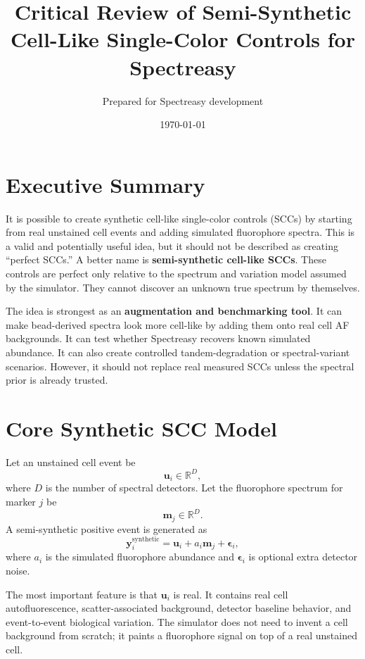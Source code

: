 \documentclass[11pt]{article}
\title{Critical Review of Semi-Synthetic Cell-Like Single-Color Controls for Spectreasy}
\author{Prepared for Spectreasy development}
\date{\today}
\newcommand{\y}{\mathbf{y}}
\newcommand{\uvec}{\mathbf{u}}
\newcommand{\m}{\mathbf{m}}
\newcommand{\eps}{\boldsymbol{\epsilon}}
\begin{document}
\maketitle

\section*{Executive Summary}

It is possible to create synthetic cell-like single-color controls (SCCs) by
starting from real unstained cell events and adding simulated fluorophore
spectra. This is a valid and potentially useful idea, but it should not be
described as creating ``perfect SCCs.'' A better name is
\textbf{semi-synthetic cell-like SCCs}. These controls are perfect only relative
to the spectrum and variation model assumed by the simulator. They cannot
discover an unknown true spectrum by themselves.

The idea is strongest as an \textbf{augmentation and benchmarking tool}. It can
make bead-derived spectra look more cell-like by adding them onto real cell AF
backgrounds. It can test whether Spectreasy recovers known simulated abundance.
It can also create controlled tandem-degradation or spectral-variant scenarios.
However, it should not replace real measured SCCs unless the spectral prior is
already trusted.

\section{Core Synthetic SCC Model}

Let an unstained cell event be
\begin{equation}
  \uvec_i \in \mathbb{R}^{D},
\end{equation}
where \(D\) is the number of spectral detectors. Let the fluorophore spectrum
for marker \(j\) be
\begin{equation}
  \m_j \in \mathbb{R}^{D}.
\end{equation}
A semi-synthetic positive event is generated as
\begin{equation}
  \y_i^{\text{synthetic}}
  =
  \uvec_i
  +
  a_i \m_j
  +
  \eps_i,
\end{equation}
where \(a_i\) is the simulated fluorophore abundance and \(\eps_i\) is optional
extra detector noise.

The most important feature is that \(\uvec_i\) is real. It contains real cell
autofluorescence, scatter-associated background, detector baseline behavior, and
event-to-event biological variation. The simulator does not need to invent a
cell background from scratch; it paints a fluorophore signal on top of a real
unstained cell.
\end{document}
